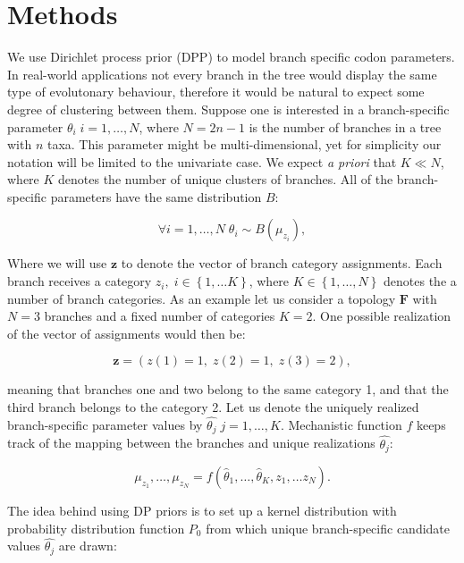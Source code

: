 \section{Methods}

We use Dirichlet process prior (DPP) to model branch specific codon parameters.
In real-world applications not every branch in the tree would display the same type of evolutonary behaviour, therefore it would be natural to expect some degree of clustering between them.
Suppose one is interested in a branch-specific parameter $\theta_{i}\;i=1,\ldots,N$, where $N=2n-1$ is the number of branches in a tree with $n$ taxa. 
This parameter might be multi-dimensional, yet for simplicity our notation will be limited to the univariate case.
We expect \emph{a priori} that $K\ll N$, where $K$ denotes the number of unique clusters of branches.
All of the branch-specific parameters have the same distribution $B$:

\begin{equation}
\forall i=1,\ldots,N \; \theta_{i}\sim B(\mu_{z_{i}}),
\label{eq:dpp1}
\end{equation}

\noindent
Where we will use $\mathbf{z}$ to denote the vector of branch category assignments.
Each branch receives a category $z_{i},\; i\in\left\{ 1,\ldots K\right\}$, where $K\in\left\{ 1,\ldots,N\right\}$ denotes the a number of branch categories.
As an example let us consider a topology $\mathbf{F}$ with $N=3$ branches and a fixed number of categories $K=2$.
One possible realization of the vector of assignments would then be:

$$\mathbf{z}=\left(z(1)=1,\; z(2)=1,\; z(3)=2\right),$$ 

\noindent
meaning that branches one and two belong to the same category 1, and that the third branch belongs to the category 2.
Let us denote the uniquely realized branch-specific parameter values by $\hat{\theta_{j}}\; j=1,\ldots,K$.
Mechanistic function $f$ keeps track of the mapping between the branches and unique realizations $\hat{\theta_{j}}$:

\begin{equation}
\mu_{z_{1}},\ldots,\mu_{z_{N}}=f\left(\hat{\theta}_{1},\ldots,\hat{\theta}_{K},z_{1},\ldots z_{N}\right).
\label{eq:dpp2}
\end{equation}

\noindent
The idea behind using DP priors is to set up a kernel distribution with probability distribution function $P_{0}$ from which unique branch-specific candidate values $\hat{\theta_{j}}$ are drawn:

